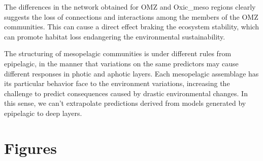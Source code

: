 \documentclass[fleqn,10pt]{wlscirep}
\begin{document}
The differences in the network obtained for OMZ and Oxic\_meso regions clearly suggests the loss of connections and interactions among the members of the OMZ communities. This can cause a direct effect braking the ecosystem stability, which can promote habitat loss endangering the environmental sustainability.

The structuring of mesopelagic communities is under different rules from epipelagic, in the manner that variations on the same predictors may cause different responses in photic and aphotic layers. Each mesopelagic assemblage has its particular behavior face to the environment variations, increasing the challenge to predict consequences caused by drastic environmental changes. In this sense, we can’t extrapolate predictions derived from models generated by epipelagic to deep layers.
\newpage
\section*{Figures}
\end{document}
